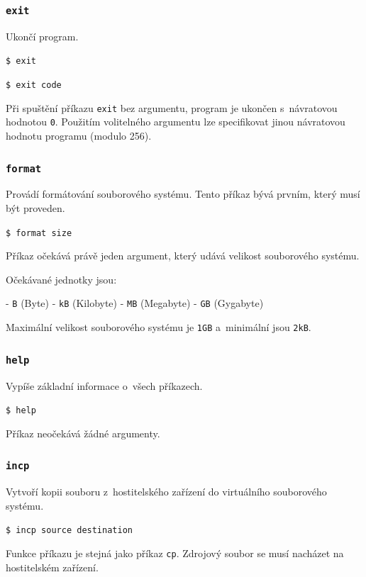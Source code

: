 \documentclass[12pt]{article}
\begin{document}
\subsubsection{\texttt{exit}}\label{sec:exit}

Ukončí program.

\texttt{\$ exit}

\texttt{\$ exit code}

Při spuštění příkazu \texttt{exit} bez argumentu, program je ukončen s~návratovou hodnotou \texttt{0}.
Použitím volitelného argumentu lze specifikovat jinou návratovou hodnotu programu (modulo 256).

\subsubsection{\texttt{format}}\label{sec:format}

Provádí formátování souborového systému.
Tento příkaz bývá prvním, který musí být proveden.

\texttt{\$ format size}

Příkaz očekává právě jeden argument, který udává velikost souborového systému.

Očekávané jednotky jsou:

- \texttt{B} (Byte)
- \texttt{kB} (Kilobyte)
- \texttt{MB} (Megabyte)
- \texttt{GB} (Gygabyte)

Maximální velikost souborového systému je \texttt{1GB} a~minimální jsou \texttt{2kB}.

\subsubsection{\texttt{help}}\label{sec:help}

Vypíše základní informace o~všech příkazech.

\texttt{\$ help}

Příkaz neočekává žádné argumenty.

\subsubsection{\texttt{incp}}\label{sec:incp}

Vytvoří kopii souboru z~hostitelského zařízení do virtuálního souborového systému.

\texttt{\$ incp source destination}

Funkce příkazu je stejná jako příkaz \texttt{cp}.
Zdrojový soubor se musí nacházet na hostitelském zařízení.
\end{document}
